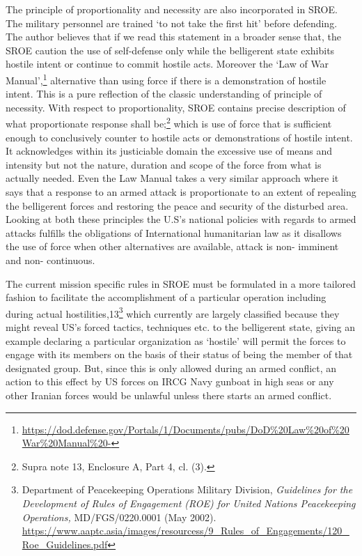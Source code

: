 \begin{multicols}{2}
\noi
The principle of proportionality and necessity are also incorporated in SROE. The military
personnel are trained ‘to not take the first hit’ before defending. The author believes that if
we read this statement in a broader sense that, the SROE caution the use of self-defense only
while the belligerent state exhibits hostile intent or continue to commit hostile acts.
Moreover the ‘Law of War Manual’,\footnote{\url{https://dod.defense.gov/Portals/1/Documents/pubs/DoD\%20Law\%20of\%20War\%20Manual\%20-}}
alternative than using force if there is a demonstration of hostile intent. This is a pure
reflection of the classic understanding of principle of necessity. With respect to
proportionality, SROE contains precise description of what proportionate response shall
be;\footnote{Supra note 13, Enclosure A, Part 4, cl. (3).}  which is use of force that is sufficient enough to conclusively counter to hostile acts or
demonstrations of hostile intent. It acknowledges within its justiciable domain the excessive
use of means and intensity but not the nature, duration and scope of the force from what is
actually needed. Even the Law Manual takes a very similar approach where it says that a
response to an armed attack is proportionate to an extent of repealing the belligerent forces
and restoring the peace and security of the disturbed area. Looking at both these principles
the U.S’s national policies with regards to armed attacks fulfills the obligations of
International humanitarian law as it disallows the use of force when other alternatives are
available, attack is non- imminent and non- continuous.

\noi
The current mission specific rules in SROE must be formulated in a more tailored fashion to
facilitate the accomplishment of a particular operation including during actual hostilities,13\footnote{Department of Peacekeeping Operations Military Division, \textit{Guidelines for the Development of Rules of
Engagement (ROE) for United Nations Peacekeeping Operations,} MD/FGS/0220.0001 (May 2002).
 \url{https://www.aaptc.asia/images/resourcess/9_Rules_of_Engagements/120_Roe_Guidelines.pdf}}
which currently are largely classified because they might reveal US’s forced tactics,
techniques etc. to the belligerent state, giving an example declaring a particular organization
as ‘hostile’ will permit the forces to engage with its members on the basis of their status of
being the member of that designated group. But, since this is only allowed during an armed
conflict, an action to this effect by US forces on IRCG Navy gunboat in high seas or any other
Iranian forces would be unlawful unless there starts an armed conflict.


\end{multicols}
